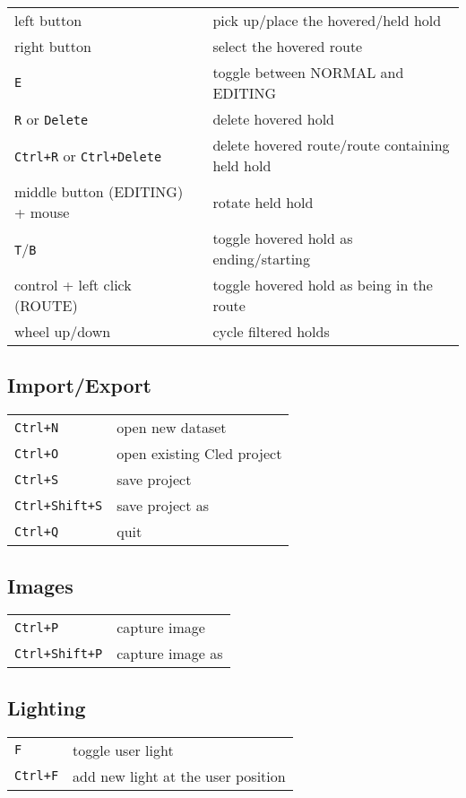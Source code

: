 \begin{tabular}[]{@{}ll@{}}
\toprule
left button & pick up/place the hovered/held hold \\
right button & select the hovered route \\
\verb|E| & toggle between NORMAL and EDITING \\
\verb|R| or \verb|Delete| & delete hovered hold \\
\verb|Ctrl+R| or \verb|Ctrl+Delete| & delete hovered route/route containing held hold \\
middle button (EDITING) + mouse & rotate held hold \\
\verb|T|/\verb|B| & toggle hovered hold as ending/starting \\
control + left click (ROUTE) & toggle hovered hold as being in the
route \\
wheel up/down & cycle filtered holds \\
\bottomrule
\end{tabular}

\subsection{Import/Export}

\begin{tabular}[]{@{}ll@{}}
\toprule
\verb|Ctrl+N| & open new dataset \\
\verb|Ctrl+O| & open existing Cled project \\
\verb|Ctrl+S| & save project \\
\verb|Ctrl+Shift+S| & save project as \\
\verb|Ctrl+Q| & quit \\
\bottomrule
\end{tabular}

\subsection{Images}

\begin{tabular}[]{@{}ll@{}}
\toprule
\verb|Ctrl+P| & capture image \\
\verb|Ctrl+Shift+P| & capture image as \\
\bottomrule
\end{tabular}

\subsection{Lighting}

\begin{tabular}[]{@{}ll@{}}
\toprule
\verb|F| & toggle user light \\
\verb|Ctrl+F| & add new light at the user position \\
\bottomrule
\end{tabular}

